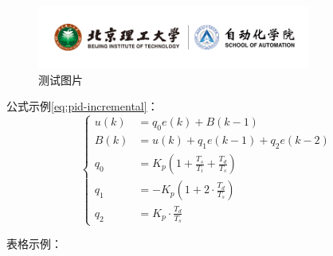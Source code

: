 \begin{figure}[H] %
    \centering
    \includegraphics[width=0.8\textwidth]{fig/北京理工大学校徽.png} %
    \caption{测试图片}
    \label{fig:myfig2}
\end{figure}

公式示例\ref{eq:pid-incremental}：
\begin{equation}
    \left\{
    \begin{aligned}
        u(k) &= q_0 e(k) + B(k-1) \\
        B(k) &= u(k) + q_1 e(k-1) + q_2 e(k-2) \\
        q_0 &= K_p \left(1 + \frac{T_s}{T_i} + \frac{T_d}{T_s} \right) \\
        q_1 &= -K_p \left(1 + 2 \cdot \frac{T_d}{T_s} \right) \\
        q_2 &= K_p \cdot \frac{T_d}{T_s}
    \end{aligned}
    \right.
    \label{eq:pid-incremental}
    \end{equation} 

表格示例：

\newpage